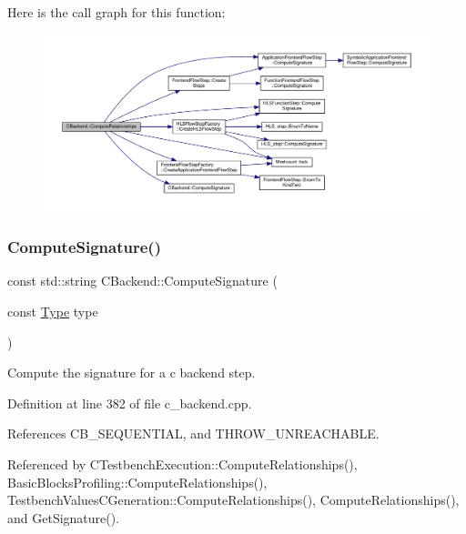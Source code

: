 Here is the call graph for this function\+:
\nopagebreak
\begin{figure}[H]
\begin{center}
\leavevmode
\includegraphics[width=350pt]{d3/de2/classCBackend_a2acdf81972285d1505ad178769bf5d53_cgraph}
\end{center}
\end{figure}
\mbox{\label{classCBackend_a25f706fe1466ee3c15d680c21f1d3025}} 
\subsubsection{\texorpdfstring{Compute\+Signature()}{ComputeSignature()}}
{\footnotesize\ttfamily const std\+::string C\+Backend\+::\+Compute\+Signature (\begin{DoxyParamCaption}\item[{const \hyperlink{classCBackend_abadfd9ef309ba4d12e648fe2e3fff08b}{Type}}]{type }\end{DoxyParamCaption})\hspace{0.3cm}{\ttfamily [static]}}



Compute the signature for a c backend step. 



Definition at line 382 of file c\+\_\+backend.\+cpp.



References C\+B\+\_\+\+S\+E\+Q\+U\+E\+N\+T\+I\+AL, and T\+H\+R\+O\+W\+\_\+\+U\+N\+R\+E\+A\+C\+H\+A\+B\+LE.



Referenced by C\+Testbench\+Execution\+::\+Compute\+Relationships(), Basic\+Blocks\+Profiling\+::\+Compute\+Relationships(), Testbench\+Values\+C\+Generation\+::\+Compute\+Relationships(), Compute\+Relationships(), and Get\+Signature().

